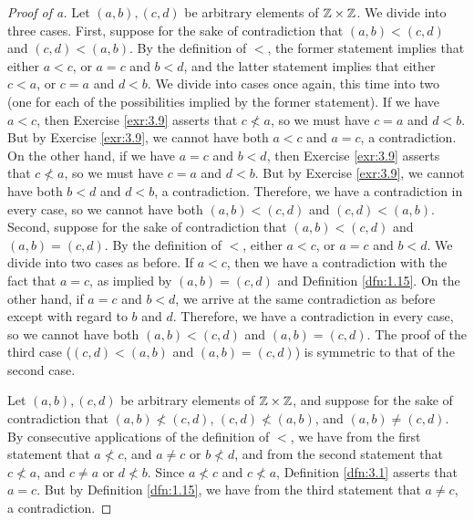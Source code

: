 \documentclass[../main.tex]{subfiles}
\begin{document}
\begin{enumerate}
\begin{proof}[Proof of a]
        Let $(a,b),(c,d)$ be arbitrary elements of $\mathbb{Z}\times\mathbb{Z}$. We divide into three cases. First, suppose for the sake of contradiction that $(a,b)<(c,d)$ and $(c,d)<(a,b)$. By the definition of $<$, the former statement implies that either $a<c$, or $a=c$ and $b<d$, and the latter statement implies that either $c<a$, or $c=a$ and $d<b$. We divide into cases once again, this time into two (one for each of the possibilities implied by the former statement). If we have $a<c$, then Exercise \ref{exr:3.9} asserts that $c\not<a$, so we must have $c=a$ and $d<b$. But by Exercise \ref{exr:3.9}, we cannot have both $a<c$ and $a=c$, a contradiction. On the other hand, if we have $a=c$ and $b<d$, then Exercise \ref{exr:3.9} asserts that $c\not<a$, so we must have $c=a$ and $d<b$. But by Exercise \ref{exr:3.9}, we cannot have both $b<d$ and $d<b$, a contradiction. Therefore, we have a contradiction in every case, so we cannot have both $(a,b)<(c,d)$ and $(c,d)<(a,b)$. Second, suppose for the sake of contradiction that $(a,b)<(c,d)$ and $(a,b)=(c,d)$. By the definition of $<$, either $a<c$, or $a=c$ and $b<d$. We divide into two cases as before. If $a<c$, then we have a contradiction with the fact that $a=c$, as implied by $(a,b)=(c,d)$ and Definition \ref{dfn:1.15}. On the other hand, if $a=c$ and $b<d$, we arrive at the same contradiction as before except with regard to $b$ and $d$. Therefore, we have a contradiction in every case, so we cannot have both $(a,b)<(c,d)$ and $(a,b)=(c,d)$. The proof of the third case ($(c,d)<(a,b)$ and $(a,b)=(c,d)$) is symmetric to that of the second case.\par
        Let $(a,b),(c,d)$ be arbitrary elements of $\mathbb{Z}\times\mathbb{Z}$, and suppose for the sake of contradiction that $(a,b)\not<(c,d)$, $(c,d)\not<(a,b)$, and $(a,b)\neq(c,d)$. By consecutive applications of the definition of $<$, we have from the first statement that $a\not<c$, and $a\neq c$ or $b\not<d$, and from the second statement that $c\not<a$, and $c\neq a$ or $d\not<b$. Since $a\not<c$ and $c\not<a$, Definition \ref{dfn:3.1} asserts that $a=c$. But by Definition \ref{dfn:1.15}, we have from the third statement that $a\neq c$, a contradiction.\par\smallskip

\end{proof}
\end{enumerate}
\end{document}
